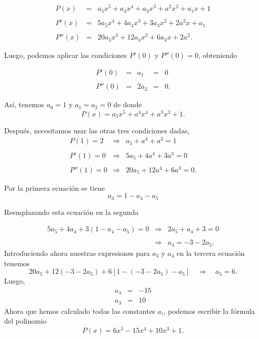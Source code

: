\begin{enumerate}[\bfseries 1.]
	$$
	\begin{array}{rcl}
	    P(x)&=&a_5x^5+a_4x^4+a_3x^3+a^2x^2+a_1x+1\\\\
	    P'(x)&=&5a_5x^4+4a_4x^3+3a_3x^2+2a^2x+a_1\\\\
	    P''(x)&=&20a_5x^3+12a_4x^2+6a_3x+2a^2.
	\end{array}
	$$

	Luego, podemos aplicar las condiciones $P'(0)$ y $P''(0)=0$, obteniendo

	$$
	\begin{array}{rcccl}
	    P'(0)&=&a_1&=&0\\\\
	    P''(0)&=&2a_2&=&0.
	\end{array}
	$$

	Así, tenemos $a_0=1$ y $a_1=a_2=0$ de donde
	$$P(x)=a_5x^5+a^4x^4+a^3x^3+1.$$

	Después, necesitamos usar las otras tres condiciones dadas,
	$$
	\begin{array}{rcl}
	    P(1)=2 &\Rightarrow& a_5+a^4+a^3=1\\\\
	    P'(1)=0 &\Rightarrow& 5a_5+4a^4+3a^3=0\\\\
	    P''(1)=0 &\Rightarrow& 20a_5+12a^4+6a^3=0.
	\end{array}
	$$

	Por la primera ecuación se tiene
	$$a_3=1-a_4-a_5$$

	Reemplazando esta ecuación en la segunda

	$$
	\begin{array}{rcl}
	    5a_5+4a_4+3(1-a_4-a_5)=0&\Rightarrow&2a_5+a_4+3=0\\\\
				    &\Rightarrow&a_4=-3-2a_5.
	\end{array}
	$$
	Introduciendo ahora nuestras expresiones para $a_3$ y $a_4$ en la tercera ecuación tenemos
	$$20a_5+12(-3-2a_5)+6\left[1-(-3-2a_5)-a_5\right]\quad \Rightarrow \quad a_5=6.$$
	Luego,
	$$
	\begin{array}{rcr}
	    a_4&=&-15\\
	    a_3&=&10
	\end{array}
	$$
	Ahora que hemos calculado todas las constantes $a_i$, podemos escribir la fórmula del polinomio
	$$P(x)=6x^5-15x^4+10x^3+1.$$\\



\end{enumerate}
